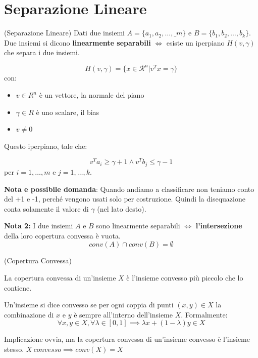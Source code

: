 \section{Separazione Lineare}
\begin{definition}
    (Separazione Lineare)
    Dati due insiemi $A = \{a_1, a_2, \dots, \_m\}$ e $B = \{b_1, b_2, \dots, b_k\}$. Due insiemi si dicono \textbf{linearmente separabili} $\iff$ esiste un iperpiano $H(v,\gamma)$ che separa i due insiemi.

    $$
        H(v,\gamma) = \{x \in \mathcal{R}^n | v^T x = \gamma\}
    $$
    con:
    \begin{itemize}
        \item $v \in R^n$ è un vettore, la normale del piano
        \item $\gamma \in R$ è uno scalare, il bias
        \item $v \neq 0$
    \end{itemize}

    Questo iperpiano, tale che:

    $$
        v^T a_i \geq \gamma + 1 \land v^T b_j \leq \gamma - 1
    $$
    per $i = 1, \dots, m$ e $j = 1, \dots, k$.
\end{definition}

\textbf{Nota e possibile domanda}: Quando andiamo a classificare non teniamo conto del +1 e -1, perché vengono usati solo per costruzione.
Quindi la disequazione conta solamente il valore di $\gamma$ (nel lato desto).

\textbf{Nota 2:} I due insiemi $A$ e $B$ sono linearmente separabili $\iff$ \textbf{l'intersezione} della loro copertura convessa è vuota.
$$
    conv(A) \cap conv(B) = \emptyset
$$

\begin{definition}
    (Copertura Convessa)

    La copertura convessa di un'insieme $X$ è l'insieme convesso più piccolo che lo
    contiene.

    Un'insieme si dice convesso se per ogni coppia di punti $(x,y) \in X$ la
    combinazione di $x$ e $y$ è sempre all'interno dell'insieme $X$. Formalmente:
    $$ \forall x,y \in X, \forall \lambda \in [0,1] \implies \lambda x + (1 -
        \lambda) y \in X $$
\end{definition}

Implicazione ovvia, ma la copertura convessa di un'insieme convesso è l'insieme
stesso. $ X\ convesso \implies conv(X) = X $

